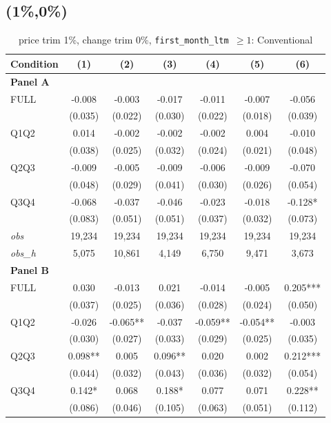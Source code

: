 \subsection{(1\%,0\%)}
\begin{table}[!htbp]
\centering
\caption{price trim 1\%, change trim 0\%, \texttt{first\_month\_ltm $\geq 1$}: Conventional}
\label{tab:abc:trim10:ltm1:conventional}
\small
\begin{tabular}{lcccccc}
\toprule
Condition & (1) & (2) & (3) & (4) & (5) & (6) \\
\midrule
\textbf{Panel A} &&&&&&  \\

FULL & -0.008 & -0.003 & -0.017 & -0.011 & -0.007 & -0.056 \\
 & (0.035) & (0.022) & (0.030) & (0.022) & (0.018) & (0.039) \\
Q1Q2 & 0.014 & -0.002 & -0.002 & -0.002 & 0.004 & -0.010 \\
 & (0.038) & (0.025) & (0.032) & (0.024) & (0.021) & (0.048) \\
Q2Q3 & -0.009 & -0.005 & -0.009 & -0.006 & -0.009 & -0.070 \\
 & (0.048) & (0.029) & (0.041) & (0.030) & (0.026) & (0.054) \\
Q3Q4 & -0.068 & -0.037 & -0.046 & -0.023 & -0.018 & -0.128* \\
 & (0.083) & (0.051) & (0.051) & (0.037) & (0.032) & (0.073) \\

\textit{obs} & 19,234 & 19,234 & 19,234 & 19,234 & 19,234 & 19,234 \\
\textit{obs\_h} &  5,075 & 10,861 &  4,149 &  6,750 &  9,471 &  3,673 \\

\textbf{Panel B} &&&&&&  \\

FULL & 0.030 & -0.013 & 0.021 & -0.014 & -0.005 & 0.205*** \\
 & (0.037) & (0.025) & (0.036) & (0.028) & (0.024) & (0.050) \\
Q1Q2 & -0.026 & -0.065** & -0.037 & -0.059** & -0.054** & -0.003 \\
 & (0.030) & (0.027) & (0.033) & (0.029) & (0.025) & (0.035) \\
Q2Q3 & 0.098** & 0.005 & 0.096** & 0.020 & 0.002 & 0.212*** \\
 & (0.044) & (0.032) & (0.043) & (0.036) & (0.032) & (0.054) \\
Q3Q4 & 0.142* & 0.068 & 0.188* & 0.077 & 0.071 & 0.228** \\
 & (0.086) & (0.046) & (0.105) & (0.063) & (0.051) & (0.112) \\


\end{tabular}
\end{table}
